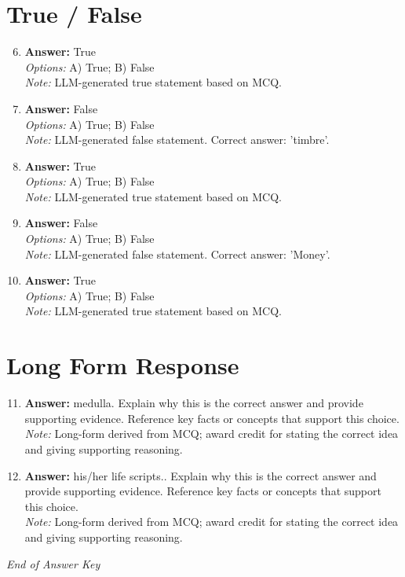 \documentclass[12pt]{article}
\begin{document}
\section*{True / False}
\begin{enumerate}[label=\arabic*.]
\setcounter{enumi}{5}
\item \textbf{Answer:} True
\\ \textit{Options:} A) True; B) False
\\ \textit{Note:} LLM-generated true statement based on MCQ.
\item \textbf{Answer:} False
\\ \textit{Options:} A) True; B) False
\\ \textit{Note:} LLM-generated false statement. Correct answer: 'timbre'.
\item \textbf{Answer:} True
\\ \textit{Options:} A) True; B) False
\\ \textit{Note:} LLM-generated true statement based on MCQ.
\item \textbf{Answer:} False
\\ \textit{Options:} A) True; B) False
\\ \textit{Note:} LLM-generated false statement. Correct answer: 'Money'.
\item \textbf{Answer:} True
\\ \textit{Options:} A) True; B) False
\\ \textit{Note:} LLM-generated true statement based on MCQ.
\end{enumerate}

\section*{Long Form Response}
\begin{enumerate}[label=\arabic*.]
\setcounter{enumi}{10}
\item \textbf{Answer:} medulla. Explain why this is the correct answer and provide supporting evidence. Reference key facts or concepts that support this choice.
\\ \textit{Note:} Long-form derived from MCQ; award credit for stating the correct idea and giving supporting reasoning.
\item \textbf{Answer:} his/her life scripts.. Explain why this is the correct answer and provide supporting evidence. Reference key facts or concepts that support this choice.
\\ \textit{Note:} Long-form derived from MCQ; award credit for stating the correct idea and giving supporting reasoning.
\end{enumerate}

\vfill
\noindent\textit{End of Answer Key}
\end{document}
